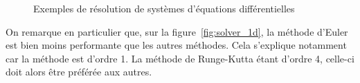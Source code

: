\begin{figure}[ht]
	\centering
	\caption{Exemples de résolution de systèmes d'équations différentielles}
	\label{fig:solver_test}
\end{figure}

On remarque en particulier que, sur la figure~\ref{fig:solver_1d}, la méthode d'Euler est bien moins performante que les autres méthodes. Cela s'explique notamment car la méthode est d'ordre 1. La méthode de Runge-Kutta étant d'ordre 4, celle-ci doit alors être préférée aux autres.